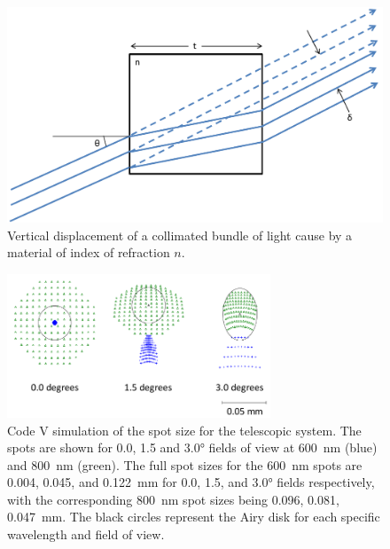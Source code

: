 \begin{figure}[h!]
    \begin{center}
    \includegraphics[width=1.0\textwidth]{./Images/3-2-PlaneParallelDisplacement.pdf}
    \caption[Telescoptic Plane Parallel Displacement]{Vertical displacement of a collimated bundle of light cause by a material of index of refraction $n$.}
    \label{fig:3.2:planeParallelDiplacement}
    \end{center}
\end{figure}

\begin{figure}[!h]
    \begin{center}
    \includegraphics[width=0.70\textwidth]{./Images/3-2-TelescopicSpotSize.pdf}
    \caption[Telescopic Prototype Spot Sizes]{Code V simulation of the spot size for the telescopic system. The spots are shown for 0.0, 1.5 and 3.0\si{\degree} fields of view at 600~nm (blue) and 800~nm (green). The full spot sizes for the 600~nm spots are 0.004, 0.045, and 0.122~mm for 0.0, 1.5, and 3.0\si{\degree} fields respectively, with the corresponding 800~nm spot sizes being 0.096, 0.081, 0.047~mm. The black circles represent the Airy disk for each specific wavelength and field of view.}
    \label{fig:3.2:telescopicSpotSize}
    \end{center}
\end{figure}

